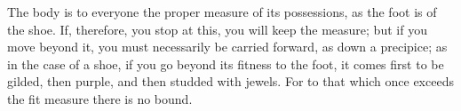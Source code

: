 The body is to everyone the proper measure of its possessions, as the
foot is of the shoe. If, therefore, you stop at this, you will keep the
measure; but if you move beyond it, you must necessarily be carried
forward, as down a precipice; as in the case of a shoe, if you go beyond
its fitness to the foot, it comes first to be gilded, then purple, and
then studded with jewels. For to that which once exceeds the fit measure
there is no bound.
